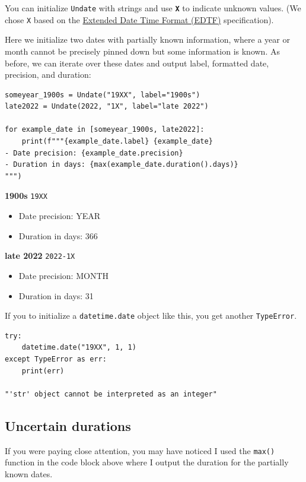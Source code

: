 \documentclass[final]{anthology-ch} %
\begin{document}
You can initialize \texttt{Undate} with strings and use\textbf{ \texttt{X}} to indicate unknown values.  (We chose \texttt{X} based on the \href{https://www.loc.gov/standards/datetime/}{Extended Date Time Format (EDTF)} specification).

Here we initialize two dates with partially known information, where a year or month cannot be precisely pinned down but some information is known. As before, we can iterate over these dates and output label, formatted date, precision, and duration:

\begin{verbatim}
someyear_1900s = Undate("19XX", label="1900s")
late2022 = Undate(2022, "1X", label="late 2022")

for example_date in [someyear_1900s, late2022]:
    print(f"""{example_date.label} {example_date}
- Date precision: {example_date.precision}
- Duration in days: {max(example_date.duration().days)}
""")
\end{verbatim}



\noindent
\textbf{1900s} \texttt{19XX}
\begin{itemize}
    \item Date precision: YEAR
    \item Duration in days: 366
\end{itemize}
    


\noindent
\textbf{late 2022} \texttt{2022-1X}
\begin{itemize}
    \item Date precision: MONTH
    \item Duration in days: 31
\end{itemize}    

If you to initialize a \texttt{datetime.date} object like this, you get another \texttt{TypeError}.    

\begin{verbatim}
try:
    datetime.date("19XX", 1, 1)
except TypeError as err:
    print(err)

"'str' object cannot be interpreted as an integer"
\end{verbatim}

\subsection{Uncertain durations}

If you were paying close attention, you may have noticed I used the \texttt{max()} function in the code block above where I output the duration for the partially known dates.
\end{document}

